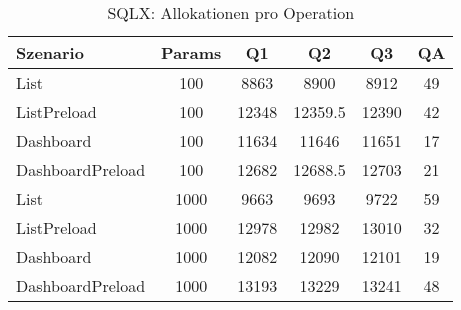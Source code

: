 \begin{table}[ht]
\centering
\caption{SQLX: Allokationen pro Operation}
\begin{tabular}{lccccc}
\toprule
Szenario & Params & Q1 & Q2 & Q3 & QA \\
\midrule
	List & 100 & 8863 & 8900 & 8912 & 49 \\
	ListPreload & 100 & 12348 & 12359.5 & 12390 & 42 \\
	Dashboard & 100 & 11634 & 11646 & 11651 & 17 \\
	DashboardPreload & 100 & 12682 & 12688.5 & 12703 & 21 \\
	List & 1000 & 9663 & 9693 & 9722 & 59 \\
	ListPreload & 1000 & 12978 & 12982 & 13010 & 32 \\
	Dashboard & 1000 & 12082 & 12090 & 12101 & 19 \\
	DashboardPreload & 1000 & 13193 & 13229 & 13241 & 48 \\
\bottomrule
\end{tabular}
\label{tab:benchmark_sqlx_allocsperop}
\end{table}
	